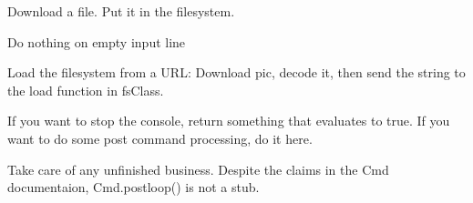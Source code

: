 \documentclass[letterpaper,10pt,english]{sphinxmanual}
\begin{document}
\begin{fulllineitems}
\begin{fulllineitems}
\label{main:main.Console.down_and_set_file}
Download a file. Put it in the filesystem.

\end{fulllineitems}


\begin{fulllineitems}
\label{main:main.Console.emptyline}
Do nothing on empty input line

\end{fulllineitems}


\begin{fulllineitems}
\label{main:main.Console.loadfs}
Load the filesystem from a URL: Download pic, decode it, then send the string to the load function in fsClass.

\end{fulllineitems}


\begin{fulllineitems}
\label{main:main.Console.open_window}
\end{fulllineitems}


\begin{fulllineitems}
\label{main:main.Console.postcmd}
If you want to stop the console, return something that evaluates to true.
If you want to do some post command processing, do it here.

\end{fulllineitems}


\begin{fulllineitems}
\label{main:main.Console.postloop}
Take care of any unfinished business.
Despite the claims in the Cmd documentaion,
Cmd.postloop() is not a stub.

\end{fulllineitems}


\end{fulllineitems}
\end{document}
